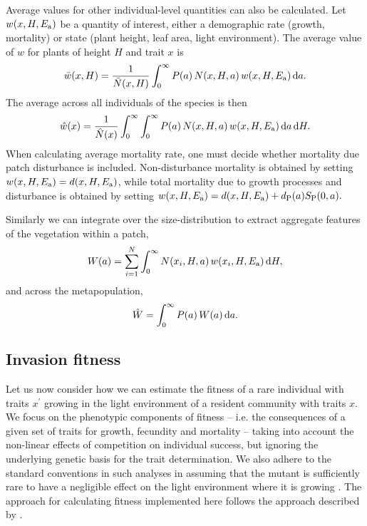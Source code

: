\documentclass[10pt,twoside]{article}
\begin{document}
Average values for other individual-level quantities can also be calculated.
Let
\(w(x, H, E_{\rm a})\) be a quantity of interest, either a demographic rate
(growth, mortality) or state (plant height, leaf area, light environment).
The average value of \(w\) for plants of height $H$ and trait $x$ is
\begin{equation}\bar{w}(x, H) = \frac1{\bar{N}(x, H)}\int_{0}^{\infty}P(a) \, N(x, H, a) \, w(x, H, E_{\rm a}) \, {\rm d}a.
\end{equation}
The average across all individuals of the species is then
\begin{equation}
  \hat{w}(x) = \frac1{\hat{N}(x) }\int_{0}^{\infty} \int_{0}^{\infty}P(a) \, N(x, H, a) \, w(x, H, E_{\rm a}) \, {\rm d}a \, {\rm d}H.
\end{equation}
When calculating average mortality rate, one must decide whether
mortality due patch disturbance is included. Non-disturbance mortality
is obtained by setting \(w(x, H, E_{\rm a}) = d(x, H, E_{\rm a})\), while total
mortality due to growth processes and disturbance is obtained by setting
\(w(x, H, E_{\rm a}) = d(x, H, E_{\rm a}) + d_{\rm P}(a) S_{\rm P}(0, a).\)

Similarly we can integrate over the size-distribution to extract aggregate
features of the vegetation within a patch,
\begin{equation}
  W(a) = \sum_{i = 1}^{N} \int_{0}^{\infty} N(x_i, H, a) \, w(x_i, H, E_{\rm a}) \, {\rm d}H,
\end{equation}
and across the metapopulation,
\begin{equation}
  \hat{W} = \int_{0}^{\infty} P(a) \, W(a) \, {\rm d}a.
\end{equation}

\subsection{Invasion fitness}\label{invasion-fitness}

Let us now consider how we can estimate the fitness of a rare individual
with traits \(x^\prime\) growing in the light environment of a resident
community with traits \(x\). We focus on the phenotypic components
of fitness -- i.e. the consequences of a given set of traits for growth,
fecundity and mortality -- taking into account the non-linear effects of
competition on individual success, but ignoring the underlying genetic
basis for the trait determination. We also adhere to the standard
conventions in such analyses in assuming that the mutant is sufficiently
rare to have a negligible effect on the light environment where it is growing \citep{Geitz-1998}.
The approach for calculating fitness implemented here follows the approach
described by \citep{Falster-2015}.
\end{document}
